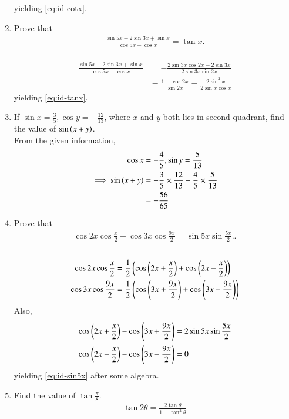 \begin{enumerate}[label=\thesubsection.\arabic*,ref=\thesubsection.\theenumi,itemsep=1ex]
yielding
	 \eqref{eq:id-cotx}.
\item Prove that 
\begin{align}
	\frac{\sin5x-2\sin3x+\sin x}{\cos5x-\cos x} = \tan x.
	 \label{eq:id-tanx}
\end{align}
%
\\
\solution
\begin{align}
	\frac{\sin5x-2\sin3x+\sin x}{\cos5x-\cos x} 
	&=
	-\frac{2\sin3x\cos2x-2\sin3x}{2\sin 3x\sin 2x}
	\\
	&=
	\frac{1-\cos2x}{\sin2x} = \frac{2\sin^2 x}{2\sin x\cos x}
\end{align}
	 yielding \eqref{eq:id-tanx}.
%
\item If $\sin x=\frac{3}{5}, \cos y=-\frac{12}{13}$, where $x$ and $y$
both lies in second quadrant, find the value of
$\sin\left(x+y\right)$.
%
\\
\solution 
From the given information,
\begin{align}
	\cos x &= -\frac{4}{5},
	\sin y = \frac{5}{13}
	\\
	\implies 
	\sin\left(x+y\right) &= -\frac{3}{5}\times \frac{12}{13} - \frac{4}{5}\times \frac{5}{13}
	\\
	&=-\frac{56}{65}
\end{align}
%
\item Prove that
\begin{align}
\cos2x\cos\frac{x}{2}-\cos3x\cos\frac{9x}{2}=\sin5x\sin\frac{5x}{2}.
	 \label{eq:id-sin5x}.
\end{align}
%
\\
\solution 
\begin{align}
\cos2x\cos\frac{x}{2}
	&=\frac{1}{2}\left(\cos\left(2x+\frac{x}{2}\right)+\cos\left(2x-\frac{x}{2}\right)\right)
	\\
\cos3x\cos\frac{9x}{2}
	&=\frac{1}{2}\left(\cos\left(3x+\frac{9x}{2}\right)+\cos\left(3x-\frac{9x}{2}\right)\right)
\end{align}
Also,
\begin{align}
	\cos\left(2x+\frac{x}{2}\right)-
\cos\left(3x+\frac{9x}{2}\right)
	&= 2\sin 5x \sin \frac{5x}{2}
\\
\cos\left(2x-\frac{x}{2}\right)
-
\cos\left(3x-\frac{9x}{2}\right)
	&= 0
\end{align}
%
yielding
	 \eqref{eq:id-sin5x} after some algebra.
\item Find the value of $\tan\frac{\pi}{8}$.
%
	\\
	\solution
\begin{align}
	\tan 2\theta = \frac{2\tan \theta}{1-\tan^2\theta}
\label{eq:id-tantheta}
\end{align}

\end{enumerate}
